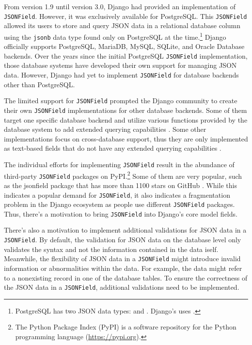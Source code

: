 From version 1.9 until version 3.0, Django had provided an implementation of
\verb|JSONField|. However, it was exclusively available for PostgreSQL. This
\verb|JSONField| allowed its users to store and query JSON data in a relational
database column using the \verb|jsonb| data type found only on PostgreSQL at
the time.\footnote{PostgreSQL has two JSON data types:  and
. Django's  uses .} Django officially
supports PostgreSQL, MariaDB, MySQL, SQLite, and Oracle Database backends. Over
the years since the initial PostgreSQL \verb|JSONField| implementation, those
database systems have developed their own support for managing JSON data.
However, Django had yet to implement \verb|JSONField| for database backends
other than PostgreSQL.

The limited support for \verb|JSONField| prompted the Django community to
create their own \verb|JSONField| implementations for other database backends.
Some of them target one specific database backend and utilize various functions
provided by the database system to add extended querying capabilities
\cite{mysql_jsonfield, oracle_jsonfield}. Some other implementations
focus on cross-database support, thus they are only implemented as text-based
fields that do not have any extended querying capabilities
\cite{ryan_jsonfield}.

The individual efforts for implementing \verb|JSONField| result in the
abundance of third-party \verb|JSONField| packages on PyPI.\footnote{The Python
Package Index (PyPI) is a software repository for the Python programming
language (\mbox{\url{https://pypi.org}}).} Some of them are very popular, such as the
\mbox{jsonfield} package that has more than 1100 stars on GitHub
\cite{ryan_jsonfield}. While this indicates a popular demand for
\verb|JSONField|, it also indicates a fragmentation problem in the Django
ecosystem as people use different \verb|JSONField| packages. Thus, there's a
motivation to bring \verb|JSONField| into Django's core model fields.

There's also a motivation to implement additional validations for JSON data in
a \verb|JSONField|. By default, the validation for JSON data on the database
level only validates the syntax and not the information contained in the data
iself. Meanwhile, the flexibility of JSON data in a \verb|JSONField| might
introduce invalid information or abnormalities within the data. For example,
the data might refer to a nonexisting record in one of the database tables. To
ensure the correctness of the JSON data in a \verb|JSONField|, additional
validations need to be implemented.

